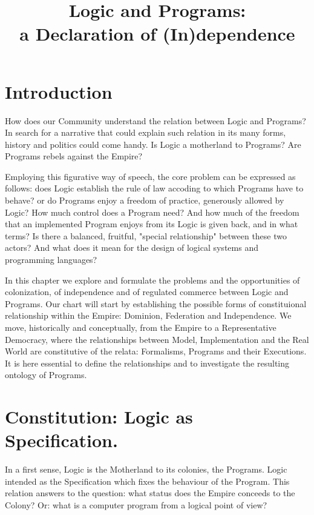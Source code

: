 \documentclass[]{article}
\title{Logic and Programs:\\
	 a Declaration of (In)dependence}
\author{}
\date{}
\begin{document}
\tableofcontents
\maketitle

%



\section{Introduction}

How does our Community understand the relation between Logic and Programs? In search for a narrative that could explain such relation in its many forms, history and politics could come handy. Is Logic a motherland to Programs? Are Programs rebels against the Empire?

Employing this figurative way of speech, the core problem can be expressed as follows: does Logic establish the rule of law accoding to which Programs have to behave? or do Programs enjoy a freedom of practice, generously allowed by Logic? How much control does a Program need? And how much of the freedom that an implemented Program enjoys from its Logic is given back, and in what terms? Is there a balanced, fruitful, "special relationship" between these two actors? And what does it mean for the design of logical systems and programming languages?

In this chapter we explore and formulate the problems and the opportunities of colonization, of independence and of regulated commerce between Logic and Programs. Our chart will start by establishing the possible forms of constituional relationship within the Empire: Dominion, Federation and Independence. We move, historically and conceptually, from the Empire to a Representative Democracy, where the relationships between Model, Implementation and the Real World are constitutive of the relata: Formalisms, Programs and their Executions. It is here essential to define the relationships and to investigate the resulting ontology of Programs. 


\section{Constitution: Logic as Specification.}

In a first sense, Logic is the Motherland to its colonies, the Programs. Logic intended as the Specification which fixes the behaviour of the Program. This relation answers to the question: what status does the Empire conceeds to the Colony? Or: what is a computer program from a logical point of view?
\end{document}
